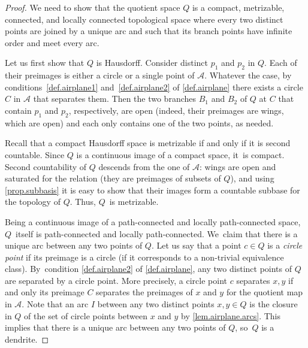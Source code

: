 \documentclass[JEP,XML,SOM,Unicode,NoFloatCountersInSection,published]{cedram}
\theoremstyle{plain}
\theoremstyle{definition}
\theoremstyle{remark}
\newcommand{\A}{\mathcal{A}}
\begin{document}
\begin{proof}
We need to show that the quotient space $Q$ is a compact, metrizable, connected, and locally connected topological space where every two distinct points are joined by a unique arc and such that its branch points have infinite order and meet every arc.

Let us first show that $Q$ is Hausdorff.
Consider distinct $p_1$ and $p_2$ in $Q$.
Each of their preimages is either a circle or a single point of $\A$.
Whatever the case, by conditions~\cref{def.airplane1} and~\cref{def.airplane2} of \cref{def.airplane} there exists a circle $C$ in $\A$ that separates them.
Then the two branches $B_1$ and $B_2$ of $Q$ at $C$ that contain $p_1$ and $p_2$, respectively, are open (indeed, their preimages are wings, which are open) and each only contains one of the two points, as needed.

Recall that a compact Hausdorff space is metrizable if and only if it is second countable.
Since $Q$ is a continuous image of a compact space, it~is compact.
Second countability of $Q$ descends from the one of $\A$:
wings are open and saturated for the relation (\ie they are preimages of subsets of $Q$), and using \cref{prop.subbasis} it is easy to show that their images form a countable subbase for the topology of $Q$.
Thus, $Q$~is metrizable.

Being a continuous image of a path-connected and locally path-connected space, $Q$~itself is path-connected and locally path-connected. We~claim that there is a unique arc between any two points of $Q$.
Let us say that a point $c\in Q$ is a \emph{circle point} if its preimage is a circle (\ie if it corresponds to a non-trivial equivalence class). By~condition \cref{def.airplane2} of \cref{def.airplane}, any two distinct points of $Q$ are separated by a circle point.
More precisely, a circle point $c$ separates $x,y$ if and only its preimage $C$ separates the preimages of $x$ and $y$ for the quotient map in $\A$.
Note that an arc $I$ between any two distinct points $x,y \in Q$ is the closure in $Q$ of the set of circle points between $x$ and $y$ by \cref{lem.airplane.arcs}.
This implies that there is a unique arc between any two points of $Q$, so~$Q$ is a dendrite.


\end{proof}
\end{document}
